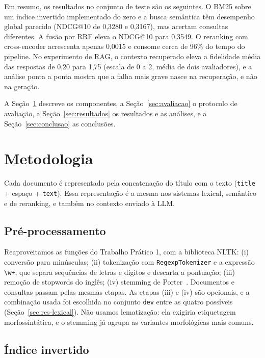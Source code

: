 \documentclass[11pt,a4paper]{article}
\newcommand{\cod}[1]{\texttt{#1}}
\begin{document}
Em resumo, os resultados no conjunto de teste são os seguintes. O BM25 sobre um índice invertido implementado do zero e a busca semântica têm desempenho global parecido (NDCG@10 de 0,3280 e 0,3167), mas acertam consultas diferentes. A fusão por RRF eleva o NDCG@10 para 0,3549. O reranking com cross-encoder acrescenta apenas 0,0015 e consome cerca de 96\% do tempo do pipeline. No experimento de RAG, o contexto recuperado eleva a fidelidade média das respostas de 0,20 para 1,75 (escala de 0 a 2, média de dois avaliadores), e a análise ponta a ponta mostra que a falha mais grave nasce na recuperação, e não na geração.

A Seção~\ref{sec:metodologia} descreve os componentes, a Seção~\ref{sec:avaliacao} o protocolo de avaliação, a Seção~\ref{sec:resultados} os resultados e as análises, e a Seção~\ref{sec:conclusao} as conclusões.

\section{Metodologia}
\label{sec:metodologia}

Cada documento é representado pela concatenação do título com o texto (\cod{title} + espaço + \cod{text}). Essa representação é a mesma nos sistemas lexical, semântico e de reranking, e também no contexto enviado à LLM.

\subsection{Pré-processamento}

Reaproveitamos as funções do Trabalho Prático 1, com a biblioteca NLTK: (i) conversão para minúsculas; (ii) tokenização com \cod{RegexpTokenizer} e a expressão \cod{\textbackslash w+}, que separa sequências de letras e dígitos e descarta a pontuação; (iii) remoção de stopwords do inglês; (iv) stemming de Porter~\cite{porter1980}. Documentos e consultas passam pelas mesmas etapas. As etapas (iii) e (iv) são opcionais, e a combinação usada foi escolhida no conjunto \cod{dev} entre as quatro possíveis (Seção~\ref{sec:res-lexical}). Não usamos lematização: ela exigiria etiquetagem morfossintática, e o stemming já agrupa as variantes morfológicas mais comuns.

\subsection{Índice invertido}
\end{document}
